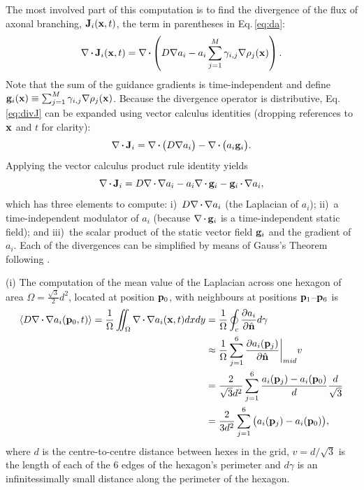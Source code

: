\documentclass[9pt,lineno]{elife}
\begin{document}
The most involved part of this computation is to find the divergence of the
flux of axonal branching, $\mathbf{J}_i(\mathbf{x},t)$, the term in parentheses in
Eq.\,\ref{eq:da}:
%
\begin{equation}
  \label{eq:divJ}
  \nabla\vcdot\mb{J}_i(\mb{x},t) = \nabla\vcdot\left(D \nabla a_i-a_i\sum_{j=1}^{M} \gamma_{i,j}\nabla \rho_j(\mb{x})\right).
\end{equation}
%
Note that the sum of the guidance gradients is time-independent and define
$\mathbf{g}_i(\mathbf{x}) \equiv \sum_{j=1}^{M} \gamma_{i,j} \nabla\rho_j(\mathbf{x})$.
Because the divergence operator is distributive, Eq.\,\ref{eq:divJ} can be
expanded using vector calculus identities (dropping references to $\mathbf{x}$ and
$t$ for clarity):
%
\begin{equation}
\nabla\vcdot\mb{J}_i = \nabla\vcdot\big(D \nabla a_i\big) - \nabla\vcdot\big(a_i \mb{g}_i\big).
\end{equation}
%
Applying the vector calculus product rule identity yields
%
\begin{equation} \label{eq:divJExpanded}
%
\nabla\vcdot\mb{J}_i =
%
D \dvrg a_i %
-
a_i\nabla\vcdot\mb{g}_i %
-
\mb{g}_i\vcdot\nabla a_i %
,
\end{equation}
%
which has three elements to compute: i)~$D \dvrg a_i$ (the Laplacian of
$a_i$); ii)~a time-independent modulator of $a_i$ (because
$\nabla\vcdot\mb{g}_i$ is a time-independent static field); and iii)~the
scalar product of the static vector field $\mathbf{g}_i$ and the gradient of
$a_i$. Each of the divergences can be simplified by means of Gauss's Theorem
following \cite{lee_hexagonal_2014}.

(i) The computation of the mean value of the Laplacian across one hexagon of
area $\Omega = \frac{\sqrt{3}}{2}d^2$, located at position $\mathbf{p}_0$, with
neighbours at positions $\mathbf{p}_1$--$\mathbf{p}_6$ is
%
\begin{equation} \label{eq:lapl}
\begin{split}
\langle D \dvrg a_i(\mb{p}_0,t) \rangle  = \frac{1}{\Omega} \iint_\Omega \dvrg a_i(\mb{x}, t) dxdy & = \frac{1}{\Omega} \oint_c \frac{\partial a_i}{\partial \hat{\mb{n}}} d\gamma \\
& \approx \frac{1}{\Omega} \sum_{j=1}^6 \frac{\partial a_i(\mb{p}_j)}{\partial \hat{\mb{n}}} \bigg\rvert_{mid} v \\
& = \frac{2}{\sqrt{3} d^2} \sum_{j=1}^6 \frac{a_i(\mb{p}_j) - a_i(\mb{p}_0)}{d} \frac{d}{\sqrt{3}} \\
& = \frac{2}{3 d^2} \sum_{j=1}^6 \big(a_i(\mb{p}_j) - a_i(\mb{p}_0)\big),
\end{split}
\end{equation}
%
where $d$ is the centre-to-centre distance between hexes in the grid, $v =
d/\sqrt{3}$ is the length of each of the 6 edges of the hexagon's perimeter
and $d\gamma$ is an infinitessimally small distance along the perimeter of the
hexagon.
\end{document}
